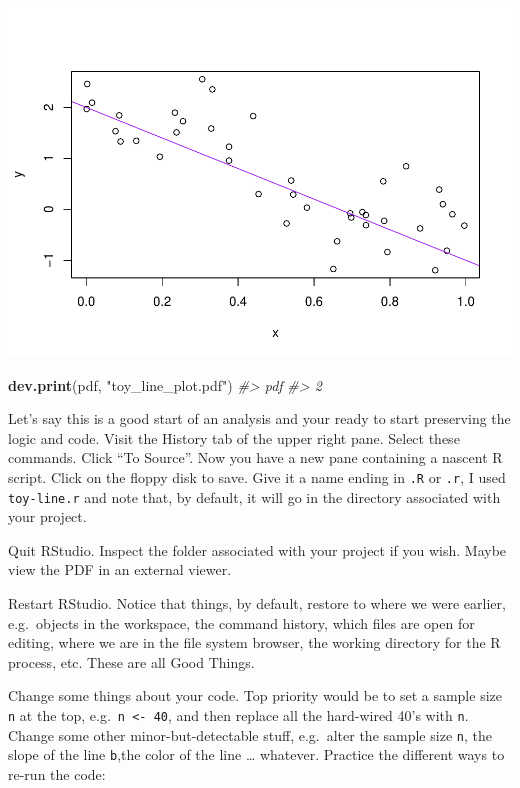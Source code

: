 \documentclass[
]{book}
\newenvironment{Shaded}{\begin{snugshade}}{\end{snugshade}}
\newcommand{\CommentTok}[1]{\textcolor[rgb]{0.56,0.35,0.01}{\textit{#1}}}
\newcommand{\KeywordTok}[1]{\textcolor[rgb]{0.13,0.29,0.53}{\textbf{#1}}}
\newcommand{\NormalTok}[1]{#1}
\newcommand{\StringTok}[1]{\textcolor[rgb]{0.31,0.60,0.02}{#1}}
\begin{document}
\includegraphics{02_r-basics_files/figure-latex/toy-line-1.pdf}

\begin{Shaded}
\begin{Highlighting}[]
\KeywordTok{dev.print}\NormalTok{(pdf, }\StringTok{"toy_line_plot.pdf"}\NormalTok{)}
\CommentTok{#> pdf }
\CommentTok{#>   2}
\end{Highlighting}
\end{Shaded}

Let's say this is a good start of an analysis and your ready to start preserving the logic and code. Visit the History tab of the upper right pane. Select these commands. Click ``To Source''. Now you have a new pane containing a nascent R script. Click on the floppy disk to save. Give it a name ending in \texttt{.R} or \texttt{.r}, I used \texttt{toy-line.r} and note that, by default, it will go in the directory associated with your project.

Quit RStudio. Inspect the folder associated with your project if you wish. Maybe view the PDF in an external viewer.

Restart RStudio. Notice that things, by default, restore to where we were earlier, e.g.~objects in the workspace, the command history, which files are open for editing, where we are in the file system browser, the working directory for the R process, etc. These are all Good Things.

Change some things about your code. Top priority would be to set a sample size \texttt{n} at the top, e.g.~\texttt{n\ \textless{}-\ 40}, and then replace all the hard-wired 40's with \texttt{n}. Change some other minor-but-detectable stuff, e.g.~alter the sample size \texttt{n}, the slope of the line \texttt{b},the color of the line \ldots{} whatever. Practice the different ways to re-run the code:
\end{document}
